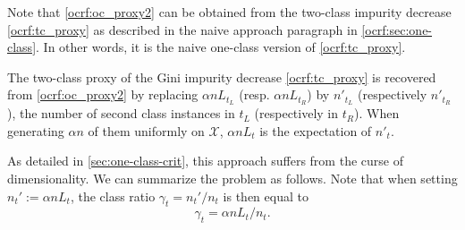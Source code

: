 %
Note that \cref{ocrf:oc_proxy2} can be obtained from the two-class impurity
decrease \cref{ocrf:tc_proxy} as described in the naive approach paragraph in
\cref{ocrf:sec:one-class}. In other words, it is the naive one-class version of
\cref{ocrf:tc_proxy}.
\begin{remark}
    The two-class proxy of the Gini impurity decrease \cref{ocrf:tc_proxy} is
    recovered from \cref{ocrf:oc_proxy2} by replacing $\alpha n L_{t_L}$ (resp.
    $\alpha n L_{t_R}$) by $n'_{t_L}$ (respectively $n'_{t_R}$), the number of
    second class instances in $t_L$ (respectively in $t_R$). When generating
    $\alpha n$ of them uniformly on $\mathcal{X}$, $\alpha n L_{t}$ is the
    expectation of $n'_{t}$.
\end{remark}
%
%
As detailed in \cref{sec:one-class-crit}, this approach suffers from the curse
of dimensionality.  We can summarize the problem as follows.
%
Note that when setting $n_t':=\alpha n L_t$, the class ratio
$\gamma_t=n_t'/n_t$ is then equal to
\begin{dmath}
    \label{ocrf:def:gamma_t}
    \gamma_t = \alpha n L_t / n_t.
\end{dmath}
